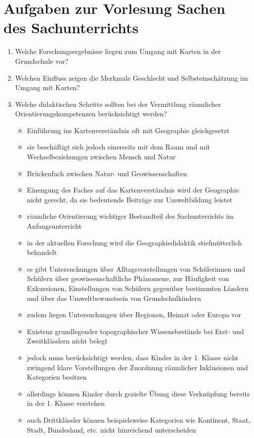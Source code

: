 \section{Aufgaben zur Vorlesung \glqq Sachen des Sachunterrichts\grqq{}}
\begin{enumerate}
	\item{Welche Forschungsergebnisse liegen zum Umgang mit Karten in der Grundschule vor?}
	\item{Welchen Einfluss zeigen die Merkmale \glqq Geschlecht\grqq{} und \glqq Selbsteinschätzung\grqq{} im Umgang mit Karten?}
	\item{
		Welche didaktischen Schritte sollten bei der Vermittlung räumlicher Orientierungskompetenzen berücksichtigt werden?
		\begin{itemize}
			\item{Einführung ins Kartenverständnis oft mit Geographie gleichgesetzt}
			\item{sie beschäftigt sich jedoch einerseits mit dem Raum und mit Wechselbeziehungen zwischen Mensch und Natur}
			\item{Brückenfach zwischen Natur- und Geowissenschaften}
			\item{Einengung des Faches auf das Kartenverständnis wird der Geographie nicht gerecht, da sie bedeutende Beiträge zur Umweltbildung leistet}
			\item{räumliche Orientierung wichtiger Bestandteil des Sachunterrichts im Anfangsunterricht}
			\item{in der aktuellen Forschung wird die Geographiedidaktik stiefmütterlich behandelt}
			\item{es gibt Untersuchungen über Alltagsvorstellungen von Schülerinnen und Schülern über geowissenschaftliche Phänomene, zur Häufigkeit von Exkursionen, Einstellungen von Schülern gegenüber bestimmten Ländern und über das Umweltbewusstsein von Grundschulkindern}
			\item{zudem liegen Untersuchungen über Regionen, Heimat oder Europa vor}
			\item{Existenz grundlegender topographischer Wissensbestände bei Erst- und Zweitklässlern nicht belegt}
			\item{jedoch muss berücksichtigt werden, dass Kinder in der 1. Klasse nicht zwingend klare Vorstellungen der Zuordnung räumlicher Inklusionen und Kategorien besitzen}
			\item{allerdings können Kinder durch gezielte Übung diese Verknüpfung bereits in der 1. Klasse verstehen}
			\item{auch Drittklässler können beispielsweise Kategorien wie Kontinent, Staat, Stadt, Bundesland, etc. nicht hinreichend unterscheiden}

\end{itemize}}
\end{enumerate}
